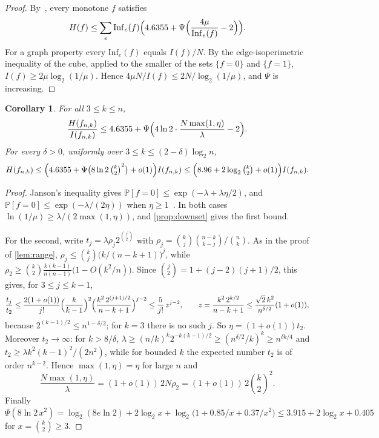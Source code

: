 \documentclass[11pt]{amsart}
\newtheorem{corollary}[theorem]{Corollary}
\theoremstyle{remark}
\renewcommand{\Pr}{\mathbb{P}}
\newcommand{\Inf}{\mathrm{Inf}}
\begin{document}
\begin{proof}
By~\cite[Corollary~1.4]{Shm26b}, every monotone $f$ satisfies
\[
H(f)\le\sum_e\Inf_e(f)\Bigl(4.6355+\Psi\Bigl(\frac{4\mu}{\Inf_e(f)}-2\Bigr)\Bigr).
\]
For a graph property every $\Inf_e(f)$ equals
$I(f)/N$. By the edge-isoperimetric inequality of the cube, applied to the smaller of the sets $\{f=0\}$ and
$\{f=1\}$, $I(f)\ge2\mu\log_2(1/\mu)$. Hence $4\mu N/I(f)\le2N/\log_2(1/\mu)$, and $\Psi$ is increasing.
\end{proof}

\begin{corollary}\label{cor:below}
For all $3\le k\le n$,
\[
\frac{H(f_{n,k})}{I(f_{n,k})}\le4.6355+\Psi\Bigl(4\ln2\cdot\frac{N\max(1,\eta)}{\lambda}-2\Bigr).
\]
For every $\delta>0$, uniformly over $3\le k\le(2-\delta)\log_2n$,
\[
H(f_{n,k})\le\Bigl(4.6355+\Psi\bigl(8\ln2\,\tbinom k2^2\bigr)+o(1)\Bigr)I(f_{n,k})
\le\Bigl(8.96+2\log_2\tbinom k2+o(1)\Bigr)I(f_{n,k}).
\]
\end{corollary}

\begin{proof}
Janson's inequality gives $\Pr[f=0]\le\exp(-\lambda+\lambda\eta/2)$, and $\Pr[f=0]\le\exp(-\lambda/(2\eta))$ when
$\eta\ge1$~\cite[Theorem~8.1.2]{AS16}. In both cases $\ln(1/\mu)\ge\lambda/(2\max(1,\eta))$, and \cref{prop:downset}
gives the first bound.

For the second, write $t_j=\lambda\rho_j2^{\binom j2}$ with $\rho_j=\binom kj\binom{n-k}{k-j}/\binom nk$. As in the proof
of \cref{lem:range}, $\rho_j\le\binom kj\bigl(k/(n-k+1)\bigr)^j$, while
$\rho_2\ge\binom k2\frac{k(k-1)}{n(n-1)}\bigl(1-O(k^2/n)\bigr)$. Since $\binom j2=1+(j-2)(j+1)/2$, this gives, for
$3\le j\le k-1$,
\[
\frac{t_j}{t_2}\le\frac{2(1+o(1))}{j!}\Bigl(\frac k{k-1}\Bigr)^2\Bigl(\frac{k^2\,2^{(j+1)/2}}{n-k+1}\Bigr)^{j-2}\le\frac5{j!}\,z^{j-2},
\qquad z=\frac{k^2\,2^{k/2}}{n-k+1}\le\frac{\sqrt2\,k^2}{n^{\delta/2}}(1+o(1)),
\]
because $2^{(k-1)/2}\le n^{1-\delta/2}$; for $k=3$ there is no such $j$. So $\eta=(1+o(1))t_2$. Moreover $t_2\to\infty$: for $k>8/\delta$,
$\lambda\ge(n/k)^k2^{-k(k-1)/2}\ge(n^{\delta/2}/k)^k\ge n^{\delta k/4}$ and $t_2\ge\lambda k^2(k-1)^2/(2n^2)$, while for
bounded $k$ the expected number $t_2$ is of order $n^{k-2}$. Hence $\max(1,\eta)=\eta$ for large $n$ and
\[
\frac{N\max(1,\eta)}\lambda=(1+o(1))\,2N\rho_2=(1+o(1))\,2\binom k2^2 .
\]
Finally
$\Psi(8\ln2\,x^2)=\log_2(8e\ln2)+2\log_2x+\log_2\bigl(1+0.85/x+0.37/x^2\bigr)\le3.915+2\log_2x+0.405$ for
$x=\binom k2\ge3$.
\end{proof}
\end{document}

